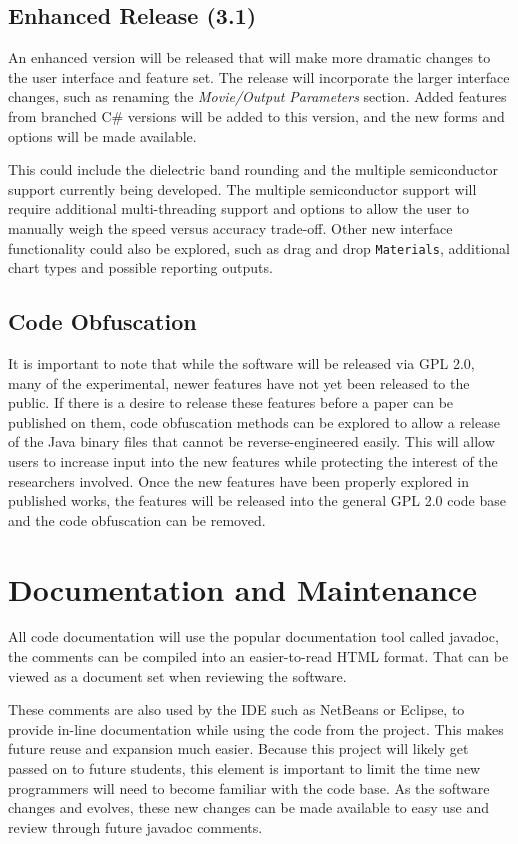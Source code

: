 \documentclass[project]{bsu-ms}
\begin{document}
\subsection{Enhanced Release (3.1)}
An enhanced version will be released that will make more dramatic changes to the user interface and feature set. The release will incorporate the larger interface changes, such as renaming the \emph{Movie/Output Parameters} section. Added features from branched C\# versions will be added to this version, and the new forms and options will be made available. 

This could include the dielectric band rounding and the multiple semiconductor support currently being developed. The multiple semiconductor support will require additional multi-threading support and options to allow the user to manually weigh the speed versus accuracy trade-off. Other new interface functionality could also be explored, such as drag and drop \texttt{Materials}, additional chart types and possible reporting outputs.


\subsection{Code Obfuscation}\label{sub:codeObfuscation}
It is important to note that while the software will be released via GPL 2.0, many of the experimental, newer features have not yet been released to the public. If there is a desire to release these features before a paper can be published on them, code obfuscation methods can be explored to allow a release of the Java binary files that cannot be reverse-engineered easily. This will allow users to increase input into the new features while protecting the interest of the researchers involved. Once the new features have been properly explored in published works, the features will be released into the general GPL 2.0 code base and the code obfuscation can be removed.



\section{Documentation and Maintenance}\label{sec:docsMaintain}
All code documentation will use the popular documentation tool called javadoc, the comments can be compiled into an easier-to-read HTML format. That can be viewed as a document set when reviewing the software. 

These comments are also used by the IDE such as NetBeans or Eclipse, to provide in-line documentation while using the code from the project. This makes future reuse and expansion much easier. Because this project will likely get passed on to future students, this element is important to limit the time new programmers will need to become familiar with the code base. As the software changes and evolves, these new changes can be made available to easy use and review through future javadoc comments.
\end{document}
